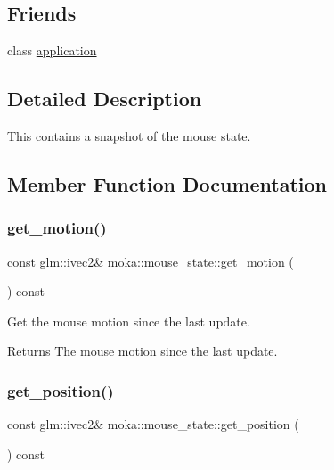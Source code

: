 \subsection*{Friends}
\begin{DoxyCompactItemize}
\item 
class \mbox{\hyperlink{classmoka_1_1mouse__state_a5b97104505447c42689b96b15027d832}{application}}
\end{DoxyCompactItemize}


\subsection{Detailed Description}
This contains a snapshot of the mouse state. 

\subsection{Member Function Documentation}
\mbox{\label{classmoka_1_1mouse__state_af0019c5bd6a56786c5595a183291aa06}} 
\subsubsection{\texorpdfstring{get\_motion()}{get\_motion()}}
{\footnotesize\ttfamily const glm\+::ivec2\& moka\+::mouse\+\_\+state\+::get\+\_\+motion (\begin{DoxyParamCaption}{ }\end{DoxyParamCaption}) const}



Get the mouse motion since the last update. 

\begin{DoxyReturn}{Returns}
The mouse motion since the last update. 
\end{DoxyReturn}
\mbox{\label{classmoka_1_1mouse__state_a873347ca6732afcd9b6460552a0db814}} 
\subsubsection{\texorpdfstring{get\_position()}{get\_position()}}
{\footnotesize\ttfamily const glm\+::ivec2\& moka\+::mouse\+\_\+state\+::get\+\_\+position (\begin{DoxyParamCaption}{ }\end{DoxyParamCaption}) const}



